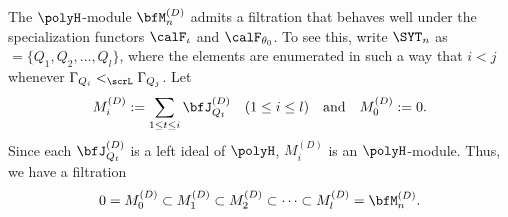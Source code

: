 \documentclass[12pt, reqno]{amsart}
\theoremstyle{plain}
\theoremstyle{definition}
\numberwithin{equation}{section}
\numberwithin{figure}{section}
\numberwithin{table}{section}
\begin{document}
The $\polyH$-module  $\bfM^{(D)}_n$ admits a filtration that behaves well under the specialization functors  $\calF_{\iota}$ and $\calF_{\theta_0}$. 
To see this, write $\SYT_n$ as $=\{Q_1,Q_2,\ldots,Q_l\}$, where the  elements are enumerated in such a way that $i < j$ whenever $\Gamma_{Q_i} <_{\scrL} \Gamma_{Q_j}$.
Let 
\[
M^{(D)}_i:=\sum_{1 \leq t \leq i} \bfJ^{(D)}_{Q_t} \quad(1 \leq i \leq l) \quad\text{and}\quad M^{(D)}_0 := 0.
\]
Since each $\bfJ^{(D)}_{Q_t}$ is a left ideal of $\polyH$,  $M^{(D)}_i$ is an $\polyH$-module. 
Thus, we have a filtration 
\begin{align}\label{eq: filt of M D}
0=M^{(D)}_0 \subset M^{(D)}_1 \subset M^{(D)}_2 \subset \cdots \subset M^{(D)}_l=\bfM^{(D)}_n.
\end{align}
\end{document}
